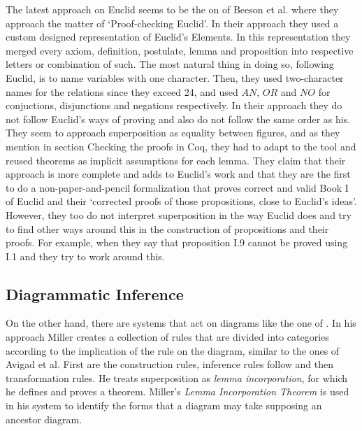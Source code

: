 \documentclass[]{interact}
\theoremstyle{plain}
\theoremstyle{definition}
\theoremstyle{remark}
\newcommand{\term}[1]{\emph{#1\/}}
\newcommand{\quotes}[1]{`#1'}
\begin{document}
The latest approach on Euclid seems to be the on of Beeson et al.
\cite{beeson2019proof} where they approach the matter of
\quotes{Proof-checking Euclid}.
In their approach they used a custom designed representation of
Euclid's Elements. In this representation they merged every axiom,
definition, postulate, lemma and proposition into respective letters
or combination of such.
The most natural thing in doing so, following Euclid, is to name
variables with one character. Then, they used two-character names for
the relations since they exceed 24, and used $AN$, $OR$ and $NO$ for
conjuctions, disjunctions and negations respectively.
In their approach they do not follow Euclid's ways of proving and also
do not follow the same order as his. They seem to approach
superposition as equality between figures, and as they mention in
section Checking the proofs in Coq, they had to adapt to the tool and
reused theorems as implicit assumptions for each lemma. They claim
that their approach is more complete and adds to Euclid's work and
that they are the first to do a non-paper-and-pencil formalization
that proves correct and valid Book I of Euclid and their
\quotes{corrected proofs of those propositions, close to Euclid's ideas}.
However, they too do not interpret superposition in the way Euclid
does and try to find other ways around this in the construction of
propositions and their proofs. For example, when they say that
proposition I.9 cannot be proved using I.1 and they try to work around
this.


\subsection{Diagrammatic Inference}
\label{sec:diagr-infer}

On the other hand, there are systems that act on diagrams like the one
of \citet{Miller2001ADF}. In his approach Miller creates a
collection of rules that are divided into categories according to the
implication of the rule on the diagram, similar to the ones of Avigad
et al. First are the construction rules, inference rules follow and
then transformation rules. He treats superposition as
\term{lemma incorporation}, for which he defines and proves a theorem.
Miller's \term{Lemma Incorporation Theorem} is used in his system to
identify the forms that a diagram may take supposing an ancestor diagram.
\end{document}
